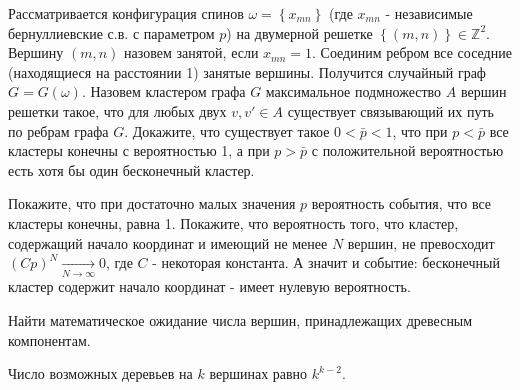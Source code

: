 \begin{problem} 
Рассматривается конфигурация спинов $\omega =\left\{x_{mn} \right\}$ (где $x_{mn} $ - независимые бернуллиевские с.в. с параметром $p$) на двумерной решетке $\left\{(m,n)\right\}\in {\mathbb Z}^{2} $. Вершину $(m,n)$ назовем занятой, если $x_{mn} =1$. Соединим ребром все соседние (находящиеся на расстоянии 1) занятые вершины. Получится случайный граф $G=G\left(\omega \right)$. Назовем кластером графа $G$ максимальное подмножество $A$ вершин решетки такое, что для любых двух $v,v'\in A$ существует связывающий их путь по ребрам графа $G$. Докажите, что существует такое $0<\bar{p}<1$, что при $p<\bar{p}$ все кластеры конечны с вероятностью 1, а при $p>\bar{p}$ с положительной вероятностью есть хотя бы один бесконечный кластер.


\begin{ordre}
Покажите, что при достаточно малых значения $p$ вероятность события, что все кластеры конечны, равна 1. Покажите, что вероятность того, что кластер, содержащий начало координат и имеющий не менее $N$ вершин, не превосходит $\left(Cp\right)^{N} \mathop{\to }\limits_{N\to \infty } 0$, где $C$ - некоторая константа. А значит и событие: бесконечный кластер содержит начало координат - имеет нулевую вероятность.
\end{ordre}

\end{problem}

\begin{problem}
Найти математическое ожидание числа вершин, принадлежащих древесным компонентам.
\begin{ordre}
Число возможных деревьев на $k$ вершинах равно $k^{k-2}$. 
\end{ordre}
\end{problem}